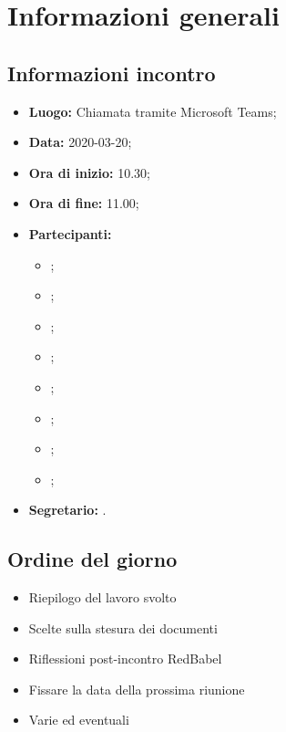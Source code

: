 \section{Informazioni generali}
\subsection{Informazioni incontro}
\begin{itemize}
	\item \textbf{Luogo:} Chiamata tramite Microsoft Teams; 
	\item \textbf{Data:} 2020-03-20;
	\item \textbf{Ora di inizio:} 10.30; 
	\item \textbf{Ora di fine:} 11.00; 
	\item \textbf{Partecipanti:}
		\begin{itemize}
			\item \VB; 
			\item \LB; 
			\item \NF; 
			\item \EG; 
			\item \FJ; 
			\item \MP; 
			\item \AS; 
			\item \AZ; 
		\end{itemize}
	\item \textbf{Segretario:} \LB. 
\end{itemize}

\subsection{Ordine del giorno}
\begin{itemize}
	\item Riepilogo del lavoro svolto
	\item Scelte sulla stesura dei documenti
	\item Riflessioni post-incontro RedBabel
	\item Fissare la data della prossima riunione
	\item Varie ed eventuali
\end{itemize}